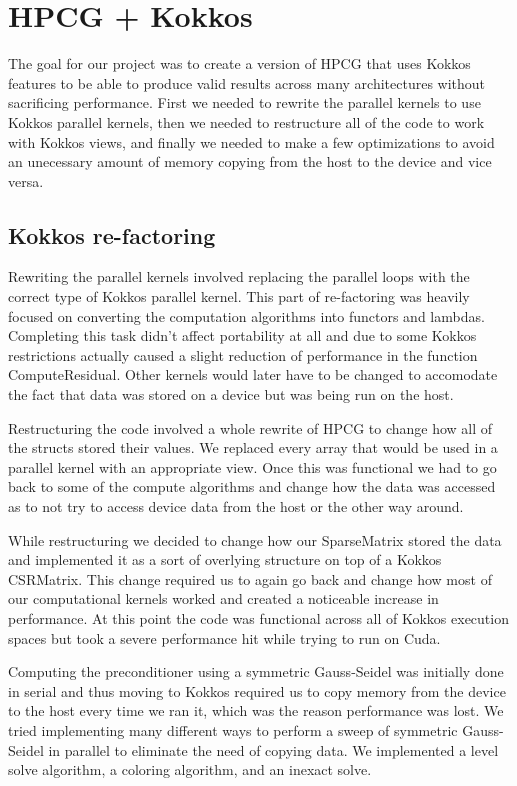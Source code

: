 \documentclass{ccr15}
\begin{document}
\section{HPCG + Kokkos}
The goal for our project was to create a version of HPCG that uses Kokkos features to be able to
produce valid results across many architectures without sacrificing performance. First we needed
to rewrite the parallel kernels to use Kokkos parallel kernels, then we needed to restructure 
all of the code to work with Kokkos views, and finally we needed to make a few optimizations to
avoid an unecessary amount of memory copying from the host to the device and vice versa.
\subsection{Kokkos re-factoring}
Rewriting the parallel kernels involved replacing the parallel loops with the correct type of
Kokkos parallel kernel. This part of re-factoring was heavily focused on converting the
computation algorithms into functors and lambdas. Completing this task didn't affect portability
at all and due to some Kokkos restrictions actually caused a slight reduction of performance in
the function ComputeResidual. Other kernels would later have to be changed to accomodate the fact
that data was stored on a device but was being run on the host.

Restructuring the code involved a whole rewrite of HPCG to change how all of the structs stored
their values. We replaced every array that would be used in a parallel kernel with an appropriate
view. Once this was functional we had to go back to some of the compute algorithms and change
how the data was accessed as to not try to access device data from the host or the
other way around.

While restructuring we decided to change how our SparseMatrix stored the data and implemented it
as a sort of overlying structure on top of a Kokkos CSRMatrix. This change required us to again
go back and change how most of our computational kernels worked and created a noticeable increase
in performance. At this point the code was functional across all of Kokkos execution spaces but
took a severe performance hit while trying to run on Cuda.

Computing the preconditioner using a symmetric Gauss-Seidel was initially done in serial and thus
moving to Kokkos required us to copy memory from the device to the host every time we ran it,
which was the reason performance was lost. We tried implementing many different ways to perform
a sweep of symmetric Gauss-Seidel in parallel to eliminate the need of copying data. We
implemented a level solve algorithm, a coloring algorithm, and an inexact solve. 
\end{document}
